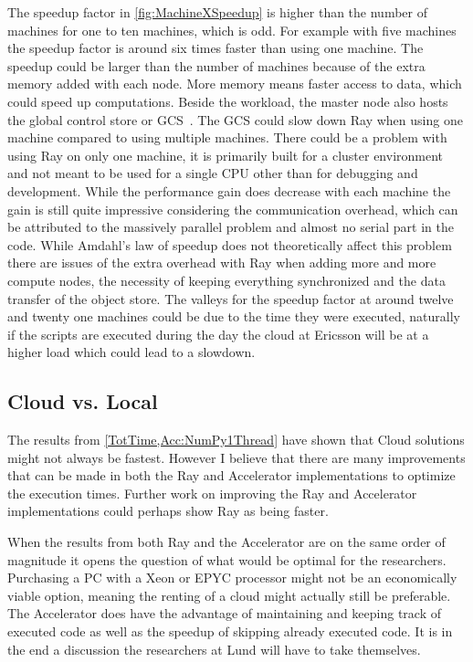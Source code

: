 \documentclass[12pt, a4paper]{article}
\begin{document}
The speedup factor in \cref{fig:MachineXSpeedup} is higher than the number of machines for one to ten machines, which is odd.
For example with five machines the speedup factor is around six times faster than using one machine.
The speedup could be larger than the number of machines because of the extra memory added with each node.
More memory means faster access to data, which could speed up computations.
Beside the workload, the master node also hosts the global control store or GCS~\cite{ray:rayCluster,ray:GCS, ray:Architecture}.
The GCS could slow down Ray when using one machine compared to using multiple machines.
There could be a problem with using Ray on only one machine, it is primarily built for a cluster environment and not meant to be used for a single CPU other than for debugging and development.
While the performance gain does decrease with each machine the gain is still quite impressive considering the communication overhead, which can be attributed to the massively parallel problem and almost no serial part in the code.
While Amdahl's law of speedup does not theoretically affect this problem there are issues of the extra overhead with Ray when adding more and more compute nodes, the necessity of keeping everything synchronized and the data transfer of the object store.
The valleys for the speedup factor at around twelve and twenty one machines could be due to the time they were executed, naturally if the scripts are executed during the day the cloud at Ericsson will be at a higher load which could lead to a slowdown.

\subsection{Cloud vs. Local}

The results from \cref{TotTime,Acc:NumPy1Thread} have shown that Cloud solutions might not always be fastest.
However I believe that there are many improvements that can be made in both the Ray and Accelerator implementations to optimize the execution times.
Further work on improving the Ray and Accelerator implementations could perhaps show Ray as being faster.

When the results from both Ray and the Accelerator are on the same order of magnitude it opens the question of what would be optimal for the researchers.
Purchasing a PC with a Xeon or EPYC processor might not be an economically viable option, meaning the renting of a cloud might actually still be preferable.
The Accelerator does have the advantage of maintaining and keeping track of executed code as well as the speedup of skipping already executed code.
It is in the end a discussion the researchers at Lund will have to take themselves.
\end{document}
